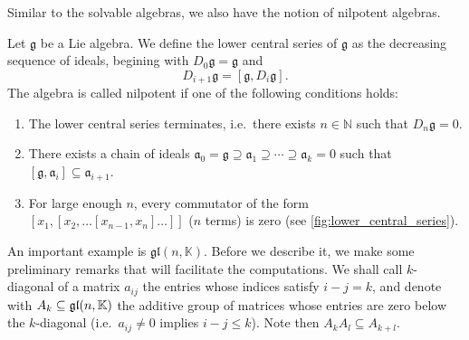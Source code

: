 \documentclass{report}
\begin{document}
Similar to the solvable algebras, we also have the notion of nilpotent algebras.
\begin{definition}
    Let $\mathfrak g$ be a Lie algebra. We define the lower central series of $\mathfrak g$ as the decreasing sequence of ideals, begining with $D_0 \mathfrak g = \mathfrak g$ and
    \[
    D_{i+1} \mathfrak g = [\mathfrak g, D_i \mathfrak g].
    \]
    The algebra is called nilpotent if one of the following conditions holds:
    \begin{enumerate}[label = (\roman*)]
        \item The lower central series terminates, i.e.\ there exists $n \in \mathbb N$ such that $D_n \mathfrak g = 0$.
        \item There exists a chain of ideals $\mathfrak a_0 = \mathfrak g \supseteq \mathfrak a_1 \supseteq \cdots \supseteq \mathfrak a_k = 0$ such that $[\mathfrak g, \mathfrak a_i] \subseteq \mathfrak a_{i+1}$.
        \item For large enough $n$, every commutator of the form $[x_1, [x_2, \ldots [x_{n-1}, x_n]\ldots]]$ ($n$ terms) is zero (see \cref{fig:lower_central_series}).
    \end{enumerate}
\end{definition}




An important example is $\mathfrak{gl}(n , \mathbb K)$.
Before we describe it, we make some preliminary remarks that will facilitate the computations.
We shall call $k$-diagonal of a matrix $a_{ij}$ the entries whose indices satisfy $i-j=k$, and denote with $A_k \subseteq \operatorname{{\mathfrak{gl}}}(n, \mathbb K)$ the additive group of matrices whose entries are zero below the $k$-diagonal (i.e.\ $a_{ij} \neq 0$ implies $i-j \leq k$).
Note then $A_k A_l \subseteq A_{k+l}$.
\end{document}
